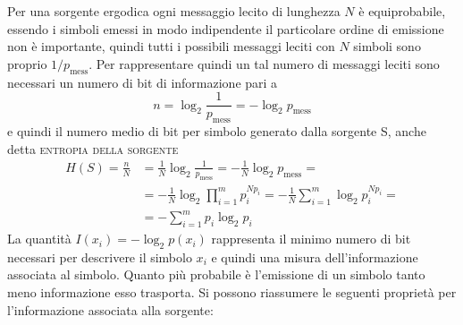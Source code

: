 Per una sorgente ergodica ogni messaggio lecito di lunghezza $N$ è equiprobabile, essendo i simboli emessi in modo indipendente il particolare ordine di emissione non è importante, quindi tutti i possibili messaggi leciti con $N$ simboli sono proprio $1/p_\text{mess}$.
Per rappresentare quindi un tal numero di messaggi leciti sono necessari un numero di bit di informazione pari a
\[
	n=\log_2\frac{1}{p_\text{mess}}=-\log_2 p_\text{mess}
\]
e quindi il numero medio di bit per simbolo generato dalla sorgente S, anche detta \textsc{entropia della sorgente}
\begin{equation}
	\begin{split}
		H(S)=\frac{n}{N}&=\frac{1}{N}\log_2\frac{1}{p_\text{mess}}=-\frac{1}{N}\log_2 p_\text{mess}=\\
		&=-\frac{1}{N}\log_2\prod_{i=1}^{m}p_i^{N p_i}=-\frac{1}{N}\sum_{i=1}^{m}\log_2 p_i^{N p_i}=\\
		&=-\sum_{i=1}^{m}p_i\log_2 p_i
	\end{split}
\end{equation}
La quantità $I(x_i)=-\log_2 p(x_i)$ rappresenta il minimo numero di bit necessari per descrivere il simbolo $x_i$ e quindi una misura dell'informazione associata al simbolo. Quanto più probabile è l'emissione di un simbolo tanto meno informazione esso trasporta. Si possono riassumere le seguenti proprietà per l'informazione associata alla sorgente:
